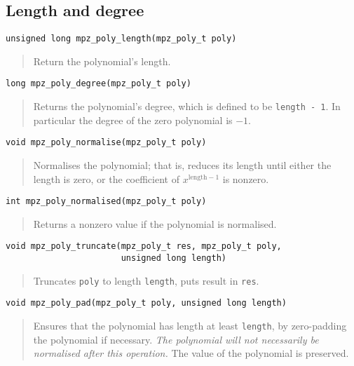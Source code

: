 \documentclass[a4paper,10pt]{article}
\newcommand{\code}{\lstinline}
\begin{document}
\subsection{Length and degree}

\begin{lstlisting}
unsigned long mpz_poly_length(mpz_poly_t poly)
\end{lstlisting}
\begin{quote}
Return the polynomial's length.
\end{quote}

\begin{lstlisting}
long mpz_poly_degree(mpz_poly_t poly)
\end{lstlisting}
\begin{quote}
Returns the polynomial's degree, which is defined to be \code{length - 1}. In particular the degree of the zero polynomial is $-1$.
\end{quote}

\begin{lstlisting}
void mpz_poly_normalise(mpz_poly_t poly)
\end{lstlisting}
\begin{quote}
Normalises the polynomial; that is, reduces its length until either the length is zero, or the coefficient of $x^{\text{length} - 1}$ is nonzero.
\end{quote}

\begin{lstlisting}
int mpz_poly_normalised(mpz_poly_t poly)
\end{lstlisting}
\begin{quote}
Returns a nonzero value if the polynomial is normalised.
\end{quote}


\begin{lstlisting}
void mpz_poly_truncate(mpz_poly_t res, mpz_poly_t poly,
                       unsigned long length)
\end{lstlisting}
\begin{quote}
Truncates \code{poly} to length \code{length}, puts result in \code{res}.
\end{quote}


\begin{lstlisting}
void mpz_poly_pad(mpz_poly_t poly, unsigned long length)
\end{lstlisting}
\begin{quote}
Ensures that the polynomial has length at least \code{length}, by zero-padding the polynomial if necessary. \emph{The polynomial will not necessarily be normalised after this operation.} The value of the polynomial is preserved.
\end{quote}
\end{document}

